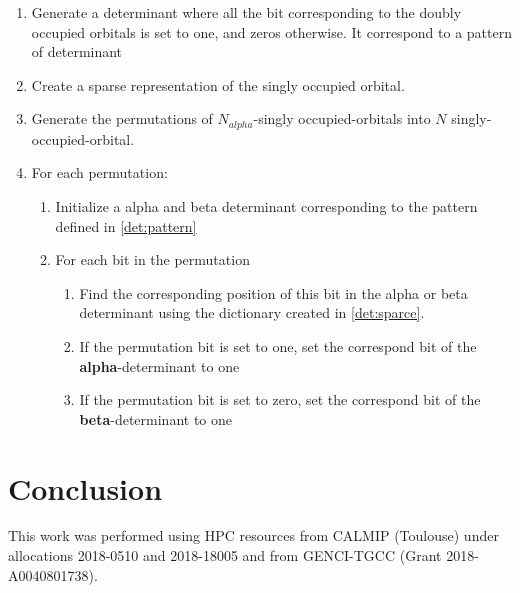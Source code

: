 \documentclass[aip,jcp,reprint,showkeys]{revtex4-1}
\begin{document}
\begin{enumerate}
    \item Generate a determinant where all the bit corresponding to the doubly occupied orbitals is set to one, and zeros otherwise. It correspond to a pattern of determinant \label{det:pattern}
    \item Create a sparse representation of the singly occupied orbital.\label{det:sparce}     %
    \item Generate the permutations of $N_{alpha}$-singly occupied-orbitals into $N$ singly-occupied-orbital. 
    \item For each permutation:
        \begin{enumerate}
            \item Initialize a alpha and beta determinant corresponding to the pattern defined in \ref{det:pattern}
            \item For each bit in the permutation
            \begin{enumerate}
                \item Find the corresponding position of this bit in the alpha or beta determinant using the dictionary created in \ref{det:sparce}.
                \item If the permutation bit is set to one, set the correspond bit of the \textbf{alpha}-determinant to one
                \item  If the permutation bit is set to zero, set the correspond bit of the \textbf{beta}-determinant to one
            \end{enumerate}
        \end{enumerate}
\end{enumerate}




\section{Conclusion}


\begin{acknowledgments}
This work was performed using HPC resources from CALMIP (Toulouse) under
allocations 2018-0510 and 2018-18005 and from GENCI-TGCC (Grant
2018-A0040801738).
\end{acknowledgments}



\end{document}
